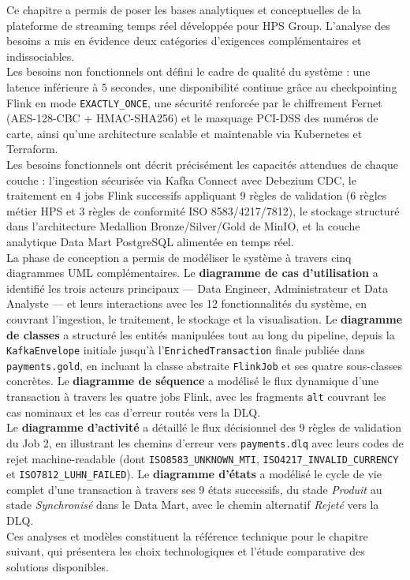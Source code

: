 Ce chapitre a permis de poser les bases analytiques et conceptuelles de la plateforme de streaming temps réel développée pour HPS Group. L'analyse des besoins a mis en évidence deux catégories d'exigences complémentaires et indissociables.
\\[0.3cm]
Les besoins non fonctionnels ont défini le cadre de qualité du système : une latence inférieure à 5 secondes, une disponibilité continue grâce au checkpointing Flink en mode \texttt{EXACTLY\_ONCE}, une sécurité renforcée par le chiffrement Fernet (AES-128-CBC + HMAC-SHA256) et le masquage PCI-DSS des numéros de carte, ainsi qu'une architecture scalable et maintenable via Kubernetes et Terraform.
\\[0.3cm]
Les besoins fonctionnels ont décrit précisément les capacités attendues de chaque couche : l'ingestion sécurisée via Kafka Connect avec Debezium CDC, le traitement en 4 jobs Flink successifs appliquant 9 règles de validation (6 règles métier HPS et 3 règles de conformité ISO 8583/4217/7812), le stockage structuré dans l'architecture Medallion Bronze/Silver/Gold de MinIO, et la couche analytique Data Mart PostgreSQL alimentée en temps réel.
\\[0.3cm]
La phase de conception a permis de modéliser le système à travers cinq diagrammes UML complémentaires. Le \textbf{diagramme de cas d'utilisation} a identifié les trois acteurs principaux --- Data Engineer, Administrateur et Data Analyste --- et leurs interactions avec les 12 fonctionnalités du système, en couvrant l'ingestion, le traitement, le stockage et la visualisation. Le \textbf{diagramme de classes} a structuré les entités manipulées tout au long du pipeline, depuis la \texttt{KafkaEnvelope} initiale jusqu'à l'\texttt{EnrichedTransaction} finale publiée dans \texttt{payments.gold}, en incluant la classe abstraite \texttt{FlinkJob} et ses quatre sous-classes concrètes. Le \textbf{diagramme de séquence} a modélisé le flux dynamique d'une transaction à travers les quatre jobs Flink, avec les fragments \texttt{alt} couvrant les cas nominaux et les cas d'erreur routés vers la DLQ.
\\[0.3cm]
Le \textbf{diagramme d'activité} a détaillé le flux décisionnel des 9 règles de validation du Job 2, en illustrant les chemins d'erreur vers \texttt{payments.dlq} avec leurs codes de rejet machine-readable (dont \texttt{ISO8583\_UNKNOWN\_MTI}, \texttt{ISO4217\_INVALID\_CURRENCY} et \texttt{ISO7812\_LUHN\_FAILED}). Le \textbf{diagramme d'états} a modélisé le cycle de vie complet d'une transaction à travers ses 9 états successifs, du stade \textit{Produit} au stade \textit{Synchronisé} dans le Data Mart, avec le chemin alternatif \textit{Rejeté} vers la DLQ.
\\[0.3cm]
Ces analyses et modèles constituent la référence technique pour le chapitre suivant, qui présentera les choix technologiques et l'étude comparative des solutions disponibles.

\newpage
